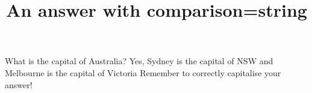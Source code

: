 \documentclass[hidesidemenu]{webquiz}
\title{An answer with comparison=string}
\begin{document}
  \begin{question}     %
     What is the capital of Australia?
     \whenRight  Yes, Sydney is the capital of NSW and Melbourne is the
     capital of Victoria
     \whenWrong Remember to correctly capitalise your answer!
  \end{question}
\end{document}
